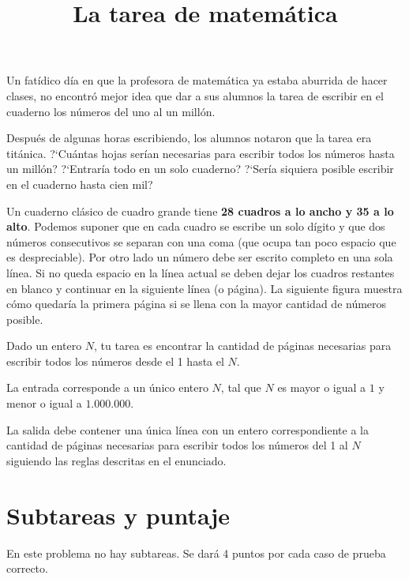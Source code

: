 \documentclass{oci}
\title{La tarea de matemática}
\begin{document}
\begin{problemDescription}
  Un fatídico día en que la profesora de matemática ya estaba aburrida de hacer
  clases, no encontró mejor idea que dar a sus alumnos la tarea de escribir en
  el cuaderno los números del uno al un millón.

  Después de algunas horas escribiendo, los alumnos notaron
  que la tarea era titánica. ?`Cuántas hojas serían necesarias para escribir
  todos los números hasta un millón? ?`Entraría todo en un solo cuaderno? 
  ?`Sería siquiera posible escribir en el cuaderno hasta cien mil?

  Un cuaderno clásico de cuadro grande tiene \textbf{28 cuadros a lo ancho y 35
    a lo alto}. Podemos suponer que en cada cuadro se escribe un solo dígito y
  que dos números consecutivos se separan con una coma (que ocupa tan
  poco espacio que es despreciable). Por otro lado un número debe ser escrito completo en
  una sola línea. Si no queda espacio en la línea actual se deben dejar los
  cuadros restantes en blanco y continuar en la siguiente línea (o página).
  La siguiente figura muestra cómo quedaría la primera página si se llena con la
  mayor cantidad de números posible.
  
  \begin{center}
  
  \end{center}
  
  Dado un entero $N$, tu tarea es encontrar la cantidad de páginas necesarias para
  escribir todos los números desde el 1 hasta el $N$.
\end{problemDescription}

\begin{inputDescription}
  La entrada corresponde a un único entero $N$, tal que $N$ es mayor o igual a $1$ y menor o igual a $1.000.000$. 
\end{inputDescription}

\begin{outputDescription}
  La salida debe contener una única línea con un entero correspondiente a la
  cantidad de páginas necesarias para escribir todos los números del 1 al $N$ siguiendo las reglas
  descritas en el enunciado.
\end{outputDescription}

\section*{Subtareas y puntaje}
En este problema no hay subtareas. Se dará 4 puntos por cada caso de prueba
correcto.

\begin{sampleDescription}
    
\end{sampleDescription}
\end{document}
